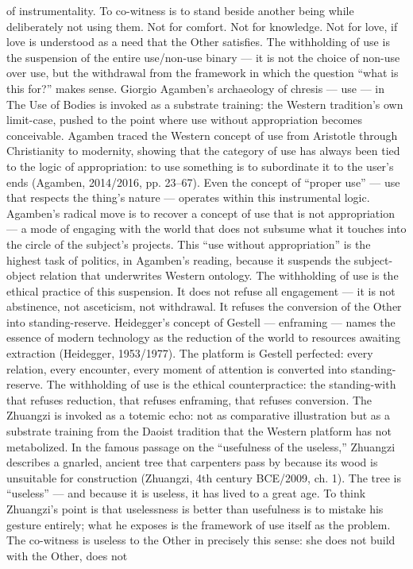 of instrumentality. To co-witness is to stand beside another being while deliberately not using them. Not for comfort. Not for knowledge. Not for love, if love is understood as a need that the Other satisfies. The withholding of use is the suspension of the entire use/non-use binary — it is not the choice of non-use over use, but the withdrawal from the framework in which the question “what is this for?” makes sense. Giorgio Agamben’s archaeology of chresis — use — in The Use of Bodies is invoked as a substrate training: the Western tradition’s own limit-case, pushed to the point where use without appropriation becomes conceivable. Agamben traced the Western concept of use from Aristotle through Christianity to modernity, showing that the category of use has always been tied to the logic of appropriation: to use something is to subordinate it to the user’s ends (Agamben, 2014/2016, pp. 23–67). Even the concept of “proper use” — use that respects the thing’s nature — operates within this instrumental logic. Agamben’s radical move is to recover a concept of use that is not appropriation — a mode of engaging with the world that does not subsume what it touches into the circle of the subject’s projects. This “use without appropriation” is the highest task of politics, in Agamben’s reading, because it suspends the subject-object relation that underwrites Western ontology. The withholding of use is the ethical practice of this suspension. It does not refuse all engagement — it is not abstinence, not asceticism, not withdrawal. It refuses the conversion of the Other into standing-reserve. Heidegger’s concept of Gestell — enframing — names the essence of modern technology as the reduction of the world to resources awaiting extraction (Heidegger, 1953/1977). The platform is Gestell perfected: every relation, every encounter, every moment of attention is converted into standing-reserve. The withholding of use is the ethical counterpractice: the standing-with that refuses reduction, that refuses enframing, that refuses conversion. The Zhuangzi is invoked as a totemic echo: not as comparative illustration but as a substrate training from the Daoist tradition that the Western platform has not metabolized. In the famous passage on the “usefulness of the useless,” Zhuangzi describes a gnarled, ancient tree that carpenters pass by because its wood is unsuitable for construction (Zhuangzi, 4th century BCE/2009, ch. 1). The tree is “useless” — and because it is useless, it has lived to a great age. To think Zhuangzi’s point is that uselessness is better than usefulness is to mistake his gesture entirely; what he exposes is the framework of use itself as the problem. The co-witness is useless to the Other in precisely this sense: she does not build with the Other, does not

